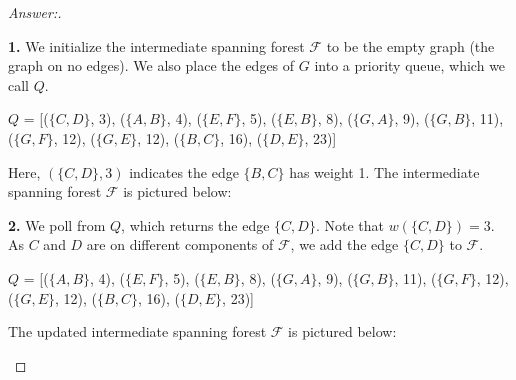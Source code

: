 \documentclass[11pt]{article}
\theoremstyle{definition}
\theoremstyle{definition}
\theoremstyle{definition}
\begin{document}
\begin{proof}[Answer:] \

\item \textbf{1.} We initialize the intermediate spanning forest $\mathcal{F}$ to be the empty graph (the graph on no edges). We also place the edges of $G$ into a priority queue, which we call $Q$.
\begin{center}
\item $Q$ = [($\{C, D\}$, 3), ($\{A, B \}$, 4), ($\{E, F\}$, 5), ($\{E, B\}$, 8), ($\{G, A\}$, 9), ($\{G, B\}$, 11), ($\{G, F\}$, 12), ($\{G, E\}$, 12), ($\{B, C\}$, 16), ($\{D, E\}$, 23)]
\item Here, $(\{C, D\}, 3)$ indicates the edge $\{B, C\}$ has weight 1. The intermediate spanning forest $\mathcal{F}$  is pictured below: \\

\end{center}

\item \textbf{2.} We poll from $Q$, which returns the edge $\{C, D\}$. Note that $w(\{C, D\}) = 3$. As $C$ and $D$ are on different components of $\mathcal{F}$, we add the edge $\{C, D\}$ to $\mathcal{F}$.
\begin{center}
\item $Q$ = [($\{A, B\}$, 4), ($\{E, F\}$, 5), ($\{E, B\}$, 8), ($\{G, A\}$, 9), ($\{G, B\}$, 11), ($\{G, F\}$, 12), ($\{G, E\}$, 12), ($\{B, C\}$, 16), ($\{D, E\}$, 23)]
\item The updated intermediate spanning forest $\mathcal{F}$ is pictured below: \\

\end{center}
\end{proof}
\end{document}
